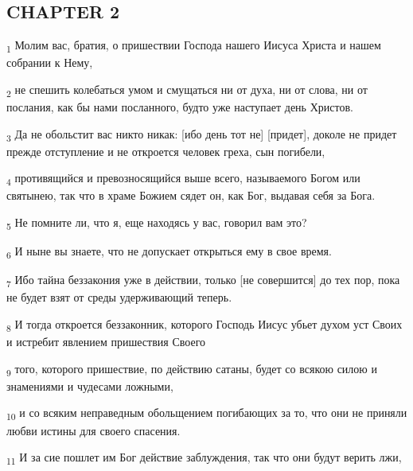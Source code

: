 \subsection{CHAPTER 2}
\begin{tcolorbox}
\textsubscript{1} Молим вас, братия, о пришествии Господа нашего Иисуса Христа и нашем собрании к Нему,
\end{tcolorbox}
\begin{tcolorbox}
\textsubscript{2} не спешить колебаться умом и смущаться ни от духа, ни от слова, ни от послания, как бы нами посланного, будто уже наступает день Христов.
\end{tcolorbox}
\begin{tcolorbox}
\textsubscript{3} Да не обольстит вас никто никак: [ибо день тот не] [придет], доколе не придет прежде отступление и не откроется человек греха, сын погибели,
\end{tcolorbox}
\begin{tcolorbox}
\textsubscript{4} противящийся и превозносящийся выше всего, называемого Богом или святынею, так что в храме Божием сядет он, как Бог, выдавая себя за Бога.
\end{tcolorbox}
\begin{tcolorbox}
\textsubscript{5} Не помните ли, что я, еще находясь у вас, говорил вам это?
\end{tcolorbox}
\begin{tcolorbox}
\textsubscript{6} И ныне вы знаете, что не допускает открыться ему в свое время.
\end{tcolorbox}
\begin{tcolorbox}
\textsubscript{7} Ибо тайна беззакония уже в действии, только [не совершится] до тех пор, пока не будет взят от среды удерживающий теперь.
\end{tcolorbox}
\begin{tcolorbox}
\textsubscript{8} И тогда откроется беззаконник, которого Господь Иисус убьет духом уст Своих и истребит явлением пришествия Своего
\end{tcolorbox}
\begin{tcolorbox}
\textsubscript{9} того, которого пришествие, по действию сатаны, будет со всякою силою и знамениями и чудесами ложными,
\end{tcolorbox}
\begin{tcolorbox}
\textsubscript{10} и со всяким неправедным обольщением погибающих за то, что они не приняли любви истины для своего спасения.
\end{tcolorbox}
\begin{tcolorbox}
\textsubscript{11} И за сие пошлет им Бог действие заблуждения, так что они будут верить лжи,
\end{tcolorbox}
